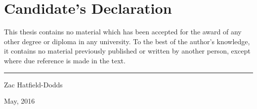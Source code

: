 \chapter{Candidate's Declaration}

This thesis contains no material which has been accepted for the award
of any other degree or diploma in any university. To the best of the
author's knowledge, it contains no material previously published or written
by another person, except where due reference is made in the text.


\vspace{20mm}  %

\hspace{80mm}\rule{40mm}{.15mm}\par   %
\hspace{80mm} Zac Hatfield-Dodds\par
\hspace{80mm} May, 2016
